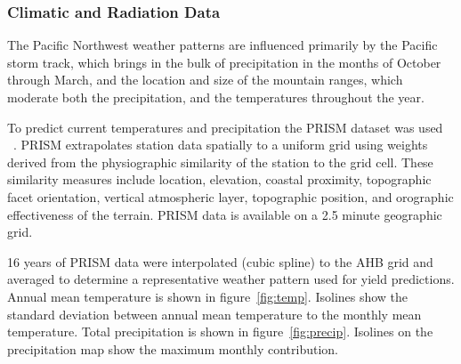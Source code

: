 \documentclass[preprint,12pt]{elsarticle}
\begin{document}
\subsubsection{Climatic and Radiation Data}
\label{sec:climate}


The Pacific Northwest weather patterns are influenced primarily by the
Pacific storm track, which brings in the bulk of precipitation in the
months of October through March, and the location and size of the
mountain ranges, which moderate both the precipitation, and the
temperatures throughout the year.

To predict current temperatures and precipitation the \acf{PRISM}
dataset was used ~\cite{Daly2008}.  \ac{PRISM} extrapolates station
data spatially to a uniform grid using weights derived from the
physiographic similarity of the station to the grid cell. These
similarity measures include location, elevation, coastal proximity,
topographic facet orientation, vertical atmospheric layer, topographic
position, and orographic effectiveness of the terrain.  \ac{PRISM}
data is available on a 2.5 minute geographic grid.

16 years of \ac{PRISM} data were interpolated (cubic spline) to the
\ac{AHB} grid and averaged to determine a representative weather
pattern used for yield predictions.  Annual mean temperature is shown
in figure~\ref{fig:temp}. Isolines show the standard deviation between
annual mean temperature to the monthly mean temperature.  Total
precipitation is shown in figure~\ref{fig:precip}.  Isolines on the
precipitation map show the maximum monthly contribution.
\end{document}
